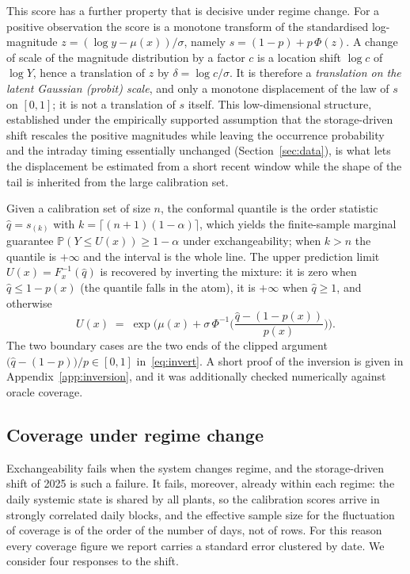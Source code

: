 \documentclass[preprint,3p,times]{elsarticle}
\begin{document}
This score has a further property that is decisive under regime change. For a positive observation the score is a monotone transform of the standardised log-magnitude $z=(\log y-\mu(x))/\sigma$, namely $s=(1-p)+p\,\Phi(z)$. A change of scale of the magnitude distribution by a factor $c$ is a location shift $\log c$ of $\log Y$, hence a translation of $z$ by $\delta=\log c/\sigma$. It is therefore a \emph{translation on the latent Gaussian (probit) scale}, and only a monotone displacement of the law of $s$ on $[0,1]$; it is not a translation of $s$ itself. This low-dimensional structure, established under the empirically supported assumption that the storage-driven shift rescales the positive magnitudes while leaving the occurrence probability and the intraday timing essentially unchanged (Section~\ref{sec:data}), is what lets the displacement be estimated from a short recent window while the shape of the tail is inherited from the large calibration set.

Given a calibration set of size $n$, the conformal quantile is the order statistic $\hat q=s_{(k)}$ with $k=\lceil (n+1)(1-\alpha)\rceil$, which yields the finite-sample marginal guarantee $\mathbb{P}(Y \le U(x)) \ge 1-\alpha$ under exchangeability; when $k>n$ the quantile is $+\infty$ and the interval is the whole line. The upper prediction limit $U(x)=F_x^{-1}(\hat q)$ is recovered by inverting the mixture: it is zero when $\hat q\le 1-p(x)$ (the quantile falls in the atom), it is $+\infty$ when $\hat q\ge 1$, and otherwise
\begin{equation}
U(x) \;=\; \exp\!\Big(\mu(x) + \sigma\,\Phi^{-1}\!\big(\textstyle\frac{\hat q-(1-p(x))}{p(x)}\big)\Big).
\label{eq:invert}
\end{equation}
The two boundary cases are the two ends of the clipped argument $\big(\hat q-(1-p)\big)/p\in[0,1]$ in~\eqref{eq:invert}. A short proof of the inversion is given in Appendix~\ref{app:inversion}, and it was additionally checked numerically against oracle coverage.

\subsection{Coverage under regime change}

Exchangeability fails when the system changes regime, and the storage-driven shift of 2025 is such a failure. It fails, moreover, already within each regime: the daily systemic state is shared by all plants, so the calibration scores arrive in strongly correlated daily blocks, and the effective sample size for the fluctuation of coverage is of the order of the number of days, not of rows. For this reason every coverage figure we report carries a standard error clustered by date. We consider four responses to the shift.
\end{document}
